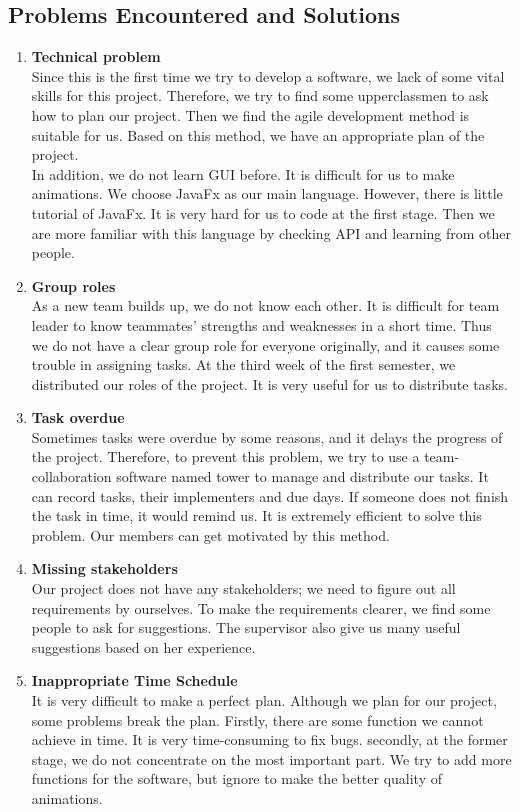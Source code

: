 \documentclass[paper=a4, fontsize=11pt,twoside]{scrartcl}		%
\begin{document}
\subsection{Problems Encountered and Solutions}
\begin{enumerate}
	\item \textbf{Technical problem}\\
Since this is the first time we try to develop a software, we lack of some vital skills for this project. Therefore, we try to find some upperclassmen to ask how to plan our project. Then we find the agile development method is suitable for us. Based on this method, we have an appropriate plan of the project. \\

In addition, we do not learn GUI before. It is difficult for us to make animations. We choose JavaFx as our main language. However, there is little tutorial of JavaFx. It is very hard for us to code at the first stage. Then we are more familiar with this language by checking API and learning from other people. 

    \item \textbf{Group roles}\\
As a new team builds up, we do not know each other. It is difficult for team leader to know teammates' strengths and weaknesses in a short time. Thus we do not have a clear group role for everyone originally, and it causes some trouble in assigning tasks. At the third week of the first semester, we distributed our roles of the project. It is very useful for us to distribute tasks. 


    \item \textbf{Task overdue}\\
Sometimes tasks were overdue by some reasons, and it delays the progress of the project. Therefore, to prevent this problem, we try to use a team-collaboration software named tower to manage and distribute our tasks. It can record tasks, their implementers and due days. If someone does not finish the task in time, it would remind us. It is extremely efficient to solve this problem. Our members can get motivated by this method.

    \item \textbf{Missing stakeholders}\\
Our project does not have any stakeholders; we need to figure out all requirements by ourselves. To make the requirements clearer, we find some people to ask for suggestions. The supervisor also give us many useful suggestions based on her experience.

	\item \textbf{ Inappropriate Time Schedule}\\
It is very difficult to make a perfect plan. Although we plan for our project, some problems break the plan. Firstly, there are some function we cannot achieve in time. It is very time-consuming to fix bugs. secondly, at the former stage, we do not concentrate on the most important part. We try to add more functions for the software, but ignore to make the better quality of animations. 

\end{enumerate}
\end{document}
